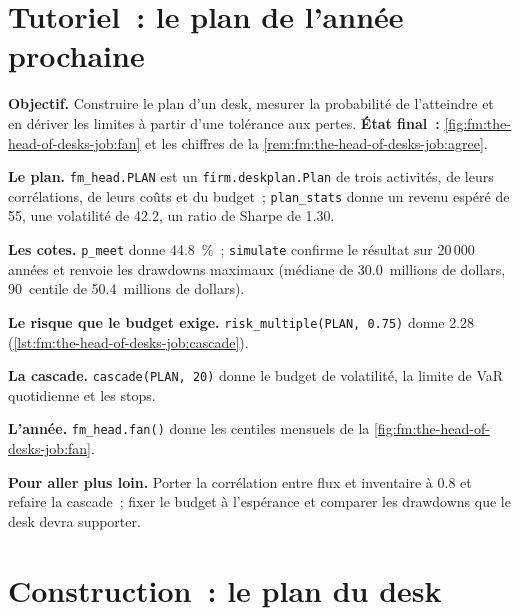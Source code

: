 \section{Tutoriel~: le plan de l'année prochaine}\label{tut:fm:the-head-of-desks-job:tut}

\begin{tutorial}
\textbf{Objectif.} Construire le plan d'un desk, mesurer la probabilité de l'atteindre et en dériver les limites à partir d'une tolérance aux pertes. \textbf{État final~:}
\cref{fig:fm:the-head-of-desks-job:fan} et les chiffres de la \cref{rem:fm:the-head-of-desks-job:agree}.
\begin{tutsteps}
\item \textbf{Le plan.} \texttt{fm\_head.PLAN} est un \texttt{firm.deskplan.Plan} de trois activités, de leurs corrélations, de leurs coûts et du
budget~; \texttt{plan\_stats} donne un revenu espéré de 55, une volatilité de 42.2, un ratio de Sharpe de 1.30.
\item \textbf{Les cotes.} \texttt{p\_meet} donne 44.8~\%~; \texttt{simulate} confirme le résultat sur 20\,000 années et renvoie les drawdowns maximaux (médiane
de 30.0~millions de dollars, 90~centile de 50.4~millions de dollars).
\item \textbf{Le risque que le budget exige.} \texttt{risk\_multiple(PLAN, 0.75)} donne 2.28 (\cref{lst:fm:the-head-of-desks-job:cascade}).
\item \textbf{La cascade.} \texttt{cascade(PLAN, 20)} donne le budget de volatilité, la limite de VaR quotidienne et les stops.
\item \textbf{L'année.} \texttt{fm\_head.fan()} donne les centiles mensuels de la \cref{fig:fm:the-head-of-desks-job:fan}.
\end{tutsteps}
\end{tutorial}

\textbf{Pour aller plus loin.} Porter la corrélation entre flux et inventaire à 0.8 et refaire la cascade~; fixer le budget à l'espérance et
comparer les drawdowns que le desk devra supporter.

\section{Construction~: le plan du desk}\label{bld:fm:the-head-of-desks-job:deskplan}

